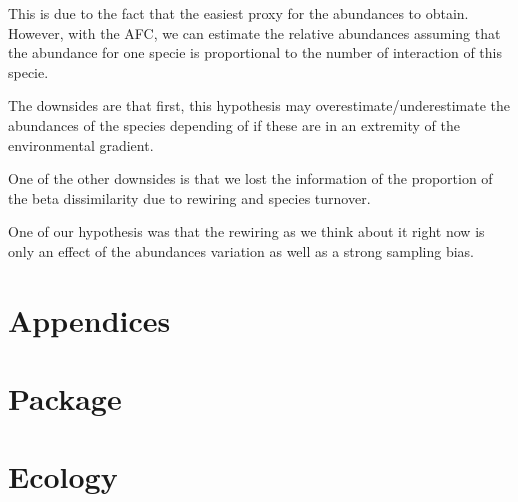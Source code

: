 \documentclass{article}
\begin{document}
This is due to the fact that the easiest proxy for the abundances to obtain. However, with the AFC, we can estimate the relative abundances assuming that the abundance for one specie is proportional to the number of interaction of this specie.

The downsides are that first, this hypothesis may overestimate/underestimate the abundances of the species depending of if these are in an extremity of the environmental gradient.

One of the other downsides is that we lost the information of the proportion of the beta dissimilarity due to rewiring and species turnover. 

One of our hypothesis was that the rewiring as we think about it right now is only an effect of the abundances variation as well as a strong sampling bias.





\section{Appendices}



\section{Package}



\section{Ecology}
\end{document}
